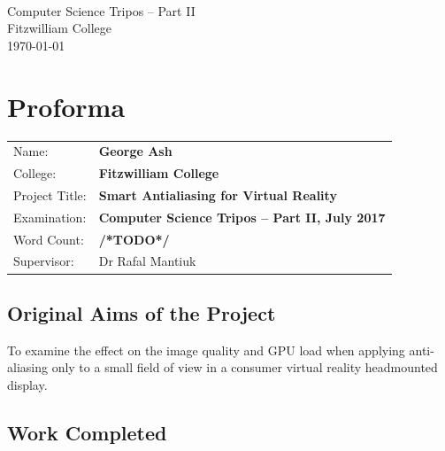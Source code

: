 \documentclass[12pt,a4paper,twoside,openright]{report}
\begin{document}





\pagestyle{empty}


\vspace*{60mm}
\begin{center}
\Huge
\textbf{} \\[5mm]
Computer Science Tripos -- Part II \\[5mm]
Fitzwilliam College \\[5mm]
\today  %
\end{center}


\pagestyle{plain}

\chapter*{Proforma}

{\large
\begin{tabular}{ll}
Name:               & \bf George Ash                       \\
College:            & \bf Fitzwilliam College                     \\
Project Title:      & \bf Smart Antialiasing for Virtual Reality \\
Examination:        & \bf Computer Science Tripos -- Part II, July 2017  \\
Word Count:         & \bf /*TODO*/ \\
Supervisor:         & Dr Rafal Mantiuk                    \\ 
\end{tabular}
}

\section*{Original Aims of the Project}

To examine the effect on the image quality and GPU load when applying anti-aliasing only to a small field of view in a consumer virtual reality headmounted display.

\section*{Work Completed}
\end{document}
